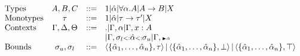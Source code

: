 \documentclass[paper.tex]{subfiles}
\begin{document}
\[
\begin{array}{lccl}
\text{Types} & A,B,C &::=& 1 | \hat{\alpha} | \forall \alpha.A | A \rightarrow B | X\\
\text{Monotypes} & \tau &::=& 1 | \hat{\alpha} | \tau \rightarrow \tau' | X \\
\text{Contexts} & \Gamma, \Delta, \Theta &::=& . | \Gamma, \alpha | \Gamma, x:A \\ &&& | \Gamma, \sigma_{l} {\scriptstyle{<:}} \hat{\alpha} {\scriptstyle{<:}} \sigma_{u} | \Gamma, {\scriptscriptstyle {\blacktriangleright \hat{\alpha}}}\\
\text{Bounds} & \sigma_{u}, \sigma_{l} &::=& \left<\{\hat{\alpha}_1,\ldots,\hat{\alpha}_n\},\tau\right> | \left<\{\hat{\alpha}_1,\ldots,\hat{\alpha}_n\},\bot\right> | \left<\{\hat{\alpha}_1,\ldots,\hat{\alpha}_n\},\top\right>\\
\end{array}
\]
\end{document}

